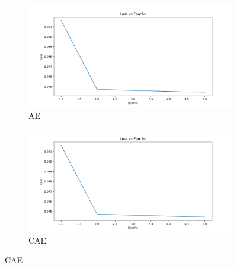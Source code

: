 \begin{figure}[!h]
  \begin{subfigure}[t]{.5\textwidth}
    \centering
    \includegraphics[width=\linewidth]{figures/loss.png}
    \caption{AE}
  \end{subfigure}
  \hfill
  \begin{subfigure}[t]{.5\textwidth}
    \centering
    \includegraphics[width=\linewidth]{figures/loss.png}
    \caption{CAE}
  \end{subfigure}

  \medskip


\end{figure}
